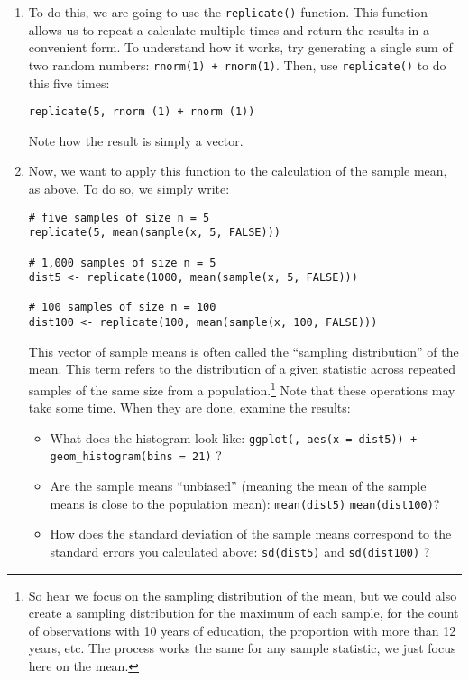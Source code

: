 \documentclass[a4paper,12pt]{article}
\begin{document}
\begin{enumerate}
\item To do this, we are going to use the \texttt{replicate()} function. This function allows us to repeat a calculate multiple times and return the results in a convenient form. To understand how it works, try generating a single sum of two random numbers: \texttt{rnorm(1) + rnorm(1)}. Then, use \texttt{replicate()} to do this five times:

\begin{verbatim}
replicate(5, rnorm (1) + rnorm (1))
\end{verbatim}

\noindent Note how the result is simply a vector.

\item Now, we want to apply this function to the calculation of the sample mean, as above. To do so, we simply write:

\begin{verbatim}
# five samples of size n = 5
replicate(5, mean(sample(x, 5, FALSE)))

# 1,000 samples of size n = 5
dist5 <- replicate(1000, mean(sample(x, 5, FALSE)))

# 100 samples of size n = 100
dist100 <- replicate(100, mean(sample(x, 100, FALSE)))
\end{verbatim}

\noindent This vector of sample means is often called the ``sampling distribution'' of the mean. This term refers to the distribution of a given statistic across repeated samples of the same size from a population.\footnote{So hear we focus on the sampling distribution of the mean, but we could also create a sampling distribution for the maximum of each sample, for the count of observations with 10 years of education, the proportion with more than 12 years, etc. The process works the same for any sample statistic, we just focus here on the mean.} Note that these operations may take some time. When they are done, examine the results:

\begin{itemize}
\item What does the histogram look like: \texttt{ggplot(, aes(x = dist5)) + geom\_histogram(bins = 21)} ?
\item Are the sample means ``unbiased'' (meaning the mean of the sample means is close to the population mean): \texttt{mean(dist5)} \texttt{mean(dist100)}?
\item How does the standard deviation of the sample means correspond to the standard errors you calculated above: \texttt{sd(dist5)} and \texttt{sd(dist100)} ?
\end{itemize}


\end{enumerate}
\end{document}
